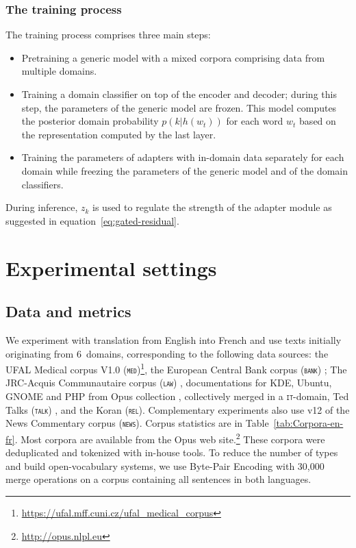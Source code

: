 \documentclass[11pt,a4paper]{article}
\newcommand{\domain}[1]{\texttt{\textsc{#1}}}
\begin{document}
\subsubsection{The training process \label{sssec:train}}
The training process comprises three main steps:
\begin{itemize}
	\item Pretraining a generic model with a mixed corpora comprising data from multiple domains.
	\item Training a domain classifier on top of the encoder and decoder; during this step, the parameters of the generic model are frozen. This model computes the posterior domain probability $p(k|h(w_t))$ for each word $w_t$ based on the representation computed by the last layer.
	\item Training the parameters of adapters with in-domain data separately for each domain while freezing the parameters of the generic model and of the domain classifiers.
\end{itemize}
During inference, $z_k$ is used to regulate the strength of the adapter module as suggested in equation~\ref{eq:gated-residual}.

\section{Experimental settings \label{sec:exp}}
\subsection{Data and metrics \label{ssec:corpora}}
We experiment with translation from English into French and use texts initially originating from 6~domains, corresponding to the following data sources: the UFAL Medical corpus V1.0 (\domain{med})\footnote{\url{https://ufal.mff.cuni.cz/ufal_medical_corpus}}, the European Central Bank corpus (\domain{bank}) \cite{Tiedemann12parallel}; The JRC-Acquis Communautaire corpus (\domain{law}) \cite{Steinberger06acquis}, documentations for KDE, Ubuntu, GNOME and PHP from Opus collection \cite{Tiedemann09news}, collectively merged in a \domain{it}-domain, Ted Talks (\domain{talk}) \cite{Cettolo12wit}, and the Koran (\domain{rel}). Complementary experiments also use v12 of the News Commentary corpus (\domain{news}). Corpus statistics are in Table~\ref{tab:Corpora-en-fr}.  Most corpora are available from the Opus web site.\footnote{\url{http://opus.nlpl.eu}} These corpora were deduplicated and tokenized with in-house tools. To reduce the number of types and build open-vocabulary systems, we use Byte-Pair Encoding \cite{Sennrich16BPE} with 30,000 merge operations on a corpus containing all sentences in both languages.%
\end{document}
